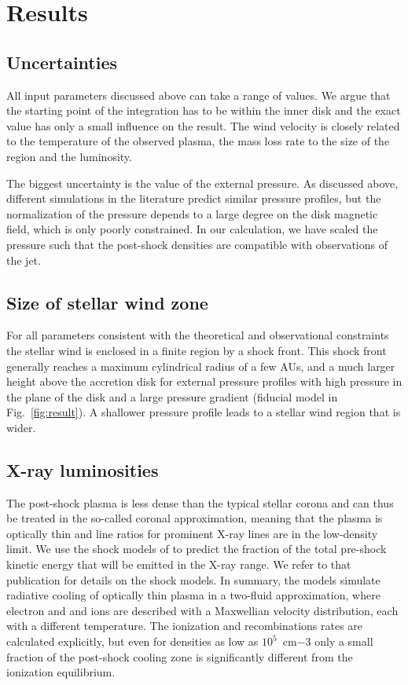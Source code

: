 \documentclass{emulateapj}
\begin{document}
\section{Results}
\label{sect:results}

\subsection{Uncertainties}
All input parameters discussed above can take a range of values. We argue that the starting point of the integration has to be within the inner disk and the exact value has only a small influence on the result. The wind velocity is closely related to the temperature of the observed plasma, the mass loss rate to the size of the region and the luminosity.

The biggest uncertainty is the value of the external pressure. As discussed above, different simulations in the literature predict similar pressure profiles, but the normalization of the pressure depends to a large degree on the disk magnetic field, which is only poorly constrained. In our calculation, we have scaled the pressure such that the post-shock densities are compatible with observations of the jet.


\subsection{Size of stellar wind zone}
For all parameters consistent with the theoretical and observational constraints the stellar wind is enclosed in a finite region by a shock front. This shock front generally reaches a maximum cylindrical radius of a few AUs, and a much larger height above the accretion disk for external pressure profiles with high pressure in the plane of the disk and a large pressure gradient (fiducial model in Fig.~\ref{fig:result}). A shallower pressure profile leads to a stellar wind region that is wider. 

\subsection{X-ray luminosities}
\label{sect:LX}
The post-shock plasma is less dense than the typical stellar corona and can thus be treated in the so-called coronal approximation, meaning that the plasma is optically thin and line ratios for prominent X-ray lines are in the low-density limit. We use the shock models of \citet{2007A&A...466.1111G} to predict the fraction of the total pre-shock kinetic energy that will be emitted in the X-ray range. We refer to that publication for details on the shock models. In summary, the models simulate radiative cooling of optically thin plasma in a two-fluid approximation, where electron and and ions are described with a Maxwellian velocity distribution, each with a different temperature. The ionization and recombinations rates are calculated explicitly, but even for densities as low as $10^5$~cm${-3}$ only a small fraction of the post-shock cooling zone is significantly different from the ionization equilibrium.
\end{document}
